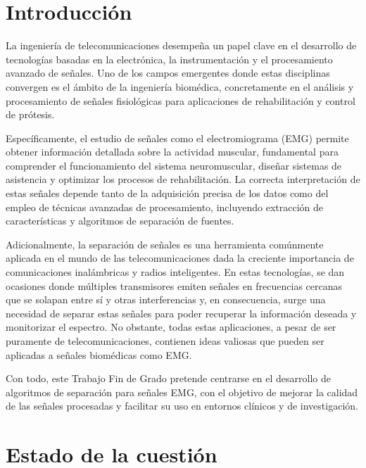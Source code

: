 \documentclass[12pt, a4paper]{article}
\let\chapter\section
\begin{document}


\pagestyle{fancy}

\section{Introducción}

La ingeniería de telecomunicaciones desempeña un papel clave en el desarrollo de tecnologías basadas en la electrónica, la instrumentación y el procesamiento avanzado de señales. Uno de los campos emergentes donde estas disciplinas convergen es el ámbito de la ingeniería biomédica, concretamente en el análisis y procesamiento de señales fisiológicas para aplicaciones de rehabilitación y control de prótesis. 

Específicamente, el estudio de señales como el electromiograma (EMG) permite obtener información detallada sobre la actividad muscular, fundamental para comprender el funcionamiento del sistema neuromuscular, diseñar sistemas de asistencia y optimizar los procesos de rehabilitación. La correcta interpretación de estas señales depende tanto de la adquisición precisa de los datos como del empleo de técnicas avanzadas de procesamiento, incluyendo extracción de características y algoritmos de separación de fuentes.

Adicionalmente, la separación de señales es una herramienta comúnmente aplicada en el mundo de las telecomunicaciones dada la creciente importancia de comunicaciones inalámbricas y radios inteligentes. En estas tecnologías, se dan ocasiones donde múltiples transmisores emiten señales en frecuencias cercanas que se solapan entre sí y otras interferencias y, en consecuencia, surge una necesidad de separar estas señales para poder recuperar la información deseada y monitorizar el espectro. No obstante, todas estas aplicaciones, a pesar de ser puramente de telecomunicaciones, contienen ideas valiosas que pueden ser aplicadas a señales biomédicas como EMG.

Con todo, este Trabajo Fin de Grado pretende centrarse en el desarrollo de algoritmos de separación para señales EMG, con el objetivo de mejorar la calidad de las señales procesadas y facilitar su uso en entornos clínicos y de investigación. 


\chapter{Estado de la cuestión}
\end{document}

